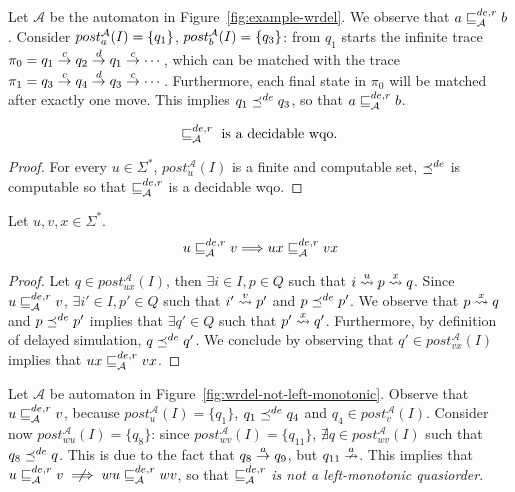 \begin{example}
Let $\mathcal{A}$ be the automaton in Figure~\ref{fig:example-wrdel}.
We observe that $a \sqsubseteq_{\mathcal{A}}^{de,r} b$.
Consider $post_{a}^{\mathcal{A}}(I) = \{q_1\}$, $post_{b}^{\mathcal{A}}(I) = \{q_3\}$:
from $q_1$ starts the infinite  trace
$\pi_0 = q_1 \overset{c}{\rightarrow} q_2 \overset{d}{\rightarrow} q_1 \overset{c}{\rightarrow} \cdots$,
which can be matched with the trace
$\pi_1 = q_3 \overset{c}{\rightarrow} q_4 \overset{d}{\rightarrow} q_3 \overset{c}{\rightarrow} \cdots$.
Furthermore, each final state in $\pi_0$ will be matched after exactly one move.
This implies $q_1 \preceq^{de} q_3$, so that $a \sqsubseteq_{\mathcal{A}}^{de,r} b$.
\end{example}

\begin{proposition}
\label{prop:wrdel-wqo}
\[\sqsubseteq_{\mathcal{A}}^{de,r} \textrm{ is a decidable wqo.}\]
\end{proposition}

\begin{proof}
For every $u \in \Sigma^*$, $post_u^{\mathcal{A}}(I)$ is a finite and computable set,
$\preceq^{de}$ is computable so that $\sqsubseteq_{\mathcal{A}}^{de,r}$ is a decidable wqo.
\end{proof}

\begin{proposition}
\label{prop:monotonicity3}
Let $u,v,x \in \Sigma^*$.
\[ u \sqsubseteq_{\mathcal{A}}^{de,r} v \Longrightarrow ux \sqsubseteq_{\mathcal{A}}^{de,r} vx \]
\end{proposition}

\begin{proof}
Let $q \in post_{ux}^{\mathcal{A}}(I)$, then $\exists i \in I, p \in Q$
such that $i \overset{u}{\rightsquigarrow} p \overset{x}{\rightsquigarrow} q$.
Since $u \sqsubseteq_{\mathcal{A}}^{de,r} v$, $\exists i' \in I, p' \in Q$ such that
$i' \overset{v}{\rightsquigarrow} p'$ and $p \preceq^{de} p'$.
We observe that $p \overset{x}{\rightsquigarrow} q$ and $p \preceq^{de} p'$ implies that
$\exists q' \in Q$ such that $p' \overset{x}{\rightsquigarrow} q'$.
Furthermore, by definition of delayed simulation, $q \preceq^{de} q'$.
We conclude by observing that $q' \in post_{vx}^{\mathcal{A}}(I)$
implies that $ux \sqsubseteq_{\mathcal{A}}^{de,r} vx$.
\end{proof}

\begin{example}
Let $\mathcal{A}$ be automaton in Figure~\ref{fig:wrdel-not-left-monotonic}.
Observe that $u \sqsubseteq_{\mathcal{A}}^{de,r} v$, because $post_{u}^{\mathcal{A}}(I) = \{q_1\}$,
$q_1 \preceq^{de} q_4$ and $q_4 \in post_{v}^{\mathcal{A}}(I)$.
Consider now $post_{wu}^{\mathcal{A}}(I) = \{q_8\}$: since
$post_{wv}^{\mathcal{A}}(I) = \{q_{11}\}$, $\nexists q \in post_{wv}^{\mathcal{A}}(I)$
such that $q_8 \preceq^{de} q$.
This is due to the fact that $q_8 \overset{a}{\rightarrow} q_9$, but $q_{11} \overset{a}{\nrightarrow}$.
This implies that $u \wrdel{A} v \centernot\implies wu \wrdel{A} wv$, so that
$\sqsubseteq_{\mathcal{A}}^{de,r}$ \emph{is not a left-monotonic quasiorder}.
\end{example}

